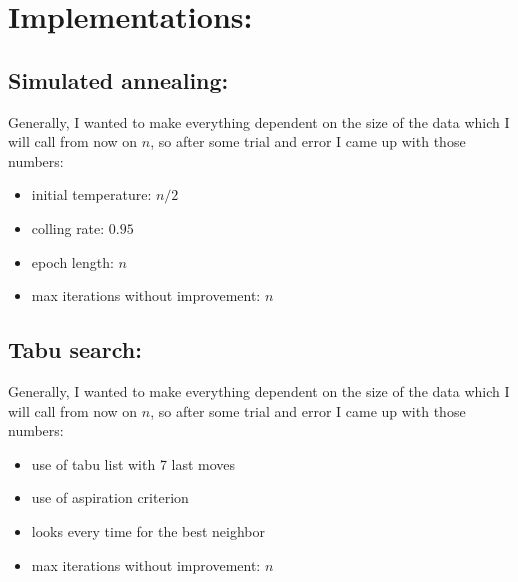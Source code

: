 \documentclass{article}
\begin{document}
    \section*{Implementations:}
\subsection*{Simulated annealing:}
Generally, I wanted to make everything dependent on the size of the data which I will call from now on $n$, so after some trial and error I came up with those numbers:
\begin{itemize}
    \item initial temperature: $n/2$
    \item colling rate: $0.95$
    \item epoch length: $n$
    \item max iterations without improvement: $n$
  \end{itemize}
\subsection*{Tabu search:}
  Generally, I wanted to make everything dependent on the size of the data which I will call from now on $n$, so after some trial and error I came up with those numbers:
  \begin{itemize}
      \item use of tabu list with 7 last moves
      \item use of aspiration criterion
      \item looks every time for the best neighbor
      \item max iterations without improvement: $n$
    \end{itemize}
\end{document}
